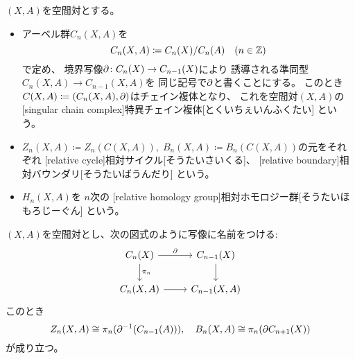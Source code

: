\documentclass[report]{jlreq}
\begin{document}
\begin{definition}[相対ホモロジー]
    $(X, A)$を空間対とする。
    \begin{itemize}
        \item アーベル群$C_n(X, A)$を
            \begin{equation}
                C_n(X, A) \coloneqq C_n(X) / C_n(A)
                    \quad (n \in \mathbb{Z})
            \end{equation}
            で定め、
            境界写像$\partial \colon C_n(X) \to C_{n - 1}(X)$により
            誘導される準同型$C_n(X, A) \to C_{n - 1}(X, A)$を
            同じ記号で$\partial$と書くことにする。
            このとき
            $C(X, A) \coloneqq (C_n(X, A), \partial)$はチェイン複体となり、
            これを空間対$(X, A)$の
            [singular chain complex]{特異チェイン複体}[とくいちぇいんふくたい]
            という。
        \item $Z_n(X, A) \coloneqq Z_n(C(X, A)), \;
            B_n(X, A) \coloneqq B_n(C(X, A))$の元をそれぞれ
            [relative cycle]{相対サイクル}[そうたいさいくる]、
            [relative boundary]{相対バウンダリ}[そうたいばうんだり]
            という。
        \item $H_n(X, A)$を
            $n$次の
            [relative homology group]{相対ホモロジー群}[そうたいほもろじーぐん]
            という。
    \end{itemize}
\end{definition}

\begin{proposition}
    $(X, A)$を空間対とし、次の図式のように写像に名前をつける:
    \begin{equation}
        \begin{tikzcd}
            C_n(X) \ar{r}{\del} \ar{d}{\pi_n}
                & C_{n - 1}(X) \ar{d} \\
            C_n(X, A) \ar{r}
                & C_{n - 1}(X, A)
        \end{tikzcd}
    \end{equation}
    このとき
    \begin{equation}
        Z_n(X, A) \cong \pi_n(\partial^{-1} (C_{n - 1}(A))),
        \quad
        B_n(X, A) \cong \pi_n(\partial C_{n + 1}(X))
    \end{equation}
    が成り立つ。
\end{proposition}
\end{document}
